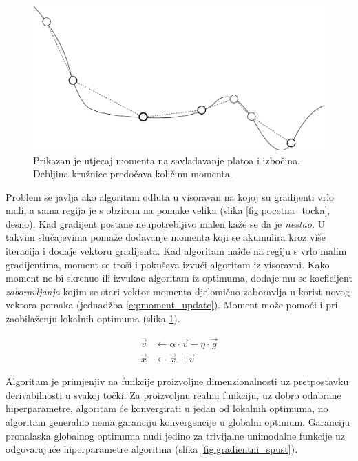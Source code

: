 \documentclass[times, utf8, numeric, diplomski]{fer}
\def\figref#1{(slika \ref{#1})}
\begin{document}
\begin{figure}[H]
\centering
\includegraphics[scale=0.6]{grad_descent_moment.pdf}
\caption{Prikazan je utjecaj momenta na savladavanje platoa i izbočina. Debljina kružnice predočava količinu momenta.}
\label{fig:visoravan}
\end{figure}

Problem se javlja ako algoritam odluta u visoravan na kojoj su gradijenti vrlo mali, a sama regija je s obzirom na pomake velika (slika \ref{fig:pocetna_tocka}, desno). Kad gradijent postane neupotrebljivo malen kaže se da je \textit{nestao}. U takvim slučajevima pomaže dodavanje momenta koji se akumulira kroz više iteracija i dodaje vektoru gradijenta. Kad algoritam naiđe na regiju s vrlo malim gradijentima, moment se troši i pokušava izvući algoritam iz visoravni. Kako moment ne bi skrenuo ili izvukao algoritam iz optimuma, dodaje mu se koeficijent \textit{zaboravljanja} kojim se stari vektor momenta djelomično zaboravlja u korist novog vektora pomaka (jednadžba \ref{eq:moment_update}). Moment može pomoći i pri zaobilaženju lokalnih optimuma \figref{fig:visoravan}.

\begin{equation}
\label{eq:moment_update}
\begin{split}
\vec{v} &\gets \alpha \cdot \vec{v} - \eta \cdot \vec{g} \\
\vec{x} &\gets \vec{x} + \vec{v}
\end{split}
\end{equation}

Algoritam je primjenjiv na funkcije proizvoljne dimenzionalnosti uz pretpostavku derivabilnosti u svakoj točki. Za proizvoljnu realnu funkciju, uz dobro odabrane hiperparametre, algoritam će konvergirati u jedan od lokalnih optimuma, no algoritam generalno nema garanciju konvergencije u globalni optimum. Garanciju pronalaska globalnog optimuma nudi jedino za trivijalne unimodalne funkcije uz odgovarajuće hiperparametre algoritma \figref{fig:gradientni_spust}.
\end{document}
